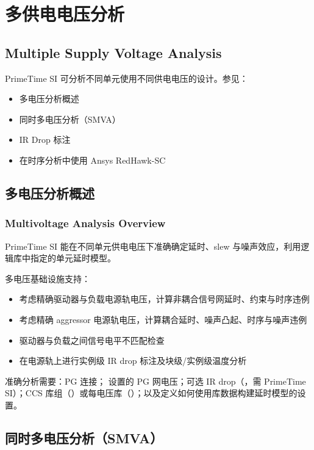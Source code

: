 \section{多供电电压分析}
\subsection*{Multiple Supply Voltage Analysis}

PrimeTime SI 可分析不同单元使用不同供电电压的设计。参见：
\begin{itemize}
  \item 多电压分析概述
  \item 同时多电压分析（SMVA）
  \item IR Drop 标注
  \item 在时序分析中使用 Ansys RedHawk-SC
\end{itemize}

\subsection{多电压分析概述}
\subsubsection*{Multivoltage Analysis Overview}

PrimeTime SI 能在不同单元供电电压下准确确定延时、slew 与噪声效应，利用逻辑库中指定的单元延时模型。

多电压基础设施支持：
\begin{itemize}
  \item 考虑精确驱动器与负载电源轨电压，计算非耦合信号网延时、约束与时序违例
  \item 考虑精确 aggressor 电源轨电压，计算耦合延时、噪声凸起、时序与噪声违例
  \item 驱动器与负载之间信号电平不匹配检查
  \item 在电源轨上进行实例级 IR drop 标注及块级/实例级温度分析
\end{itemize}

准确分析需要：PG 连接； 设置的 PG 网电压；可选 IR drop（，需 PrimeTime SI）；CCS 库组（）或每电压库（）；以及定义如何使用库数据构建延时模型的设置。

\subsection{同时多电压分析（SMVA）}
